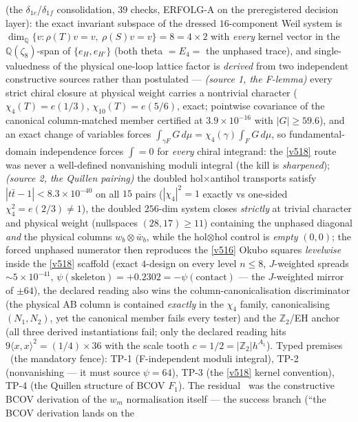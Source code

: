 \documentclass[11pt,a4paper]{article}
\newcommand{\Z}{\mathbb Z}
\begin{document}
\begin{itemize}
\begin{itemize}
 (the $\delta_{1e}$/$\delta_{1f}$
consolidation, $39$ checks, ERFOLG-A on the preregistered decision layer): the exact invariant
subspace of the dressed $16$-component Weil system is
$\dim_{\mathbb Q}\{v:\rho(T)v=v,\ \rho(S)v=v\}=8=4\times2$ with \emph{every} kernel vector in
the $\mathbb Q(\zeta_8)$-span of $\{e_H,e_{H'}\}$ (both theta $=E_4=$ the unphased trace), and
single-valuedness of the physical one-loop lattice factor is \emph{derived} from two
independent constructive sources rather than postulated --- \emph{(source 1, the F-lemma)}
every strict chiral closure at physical weight carries a nontrivial character
($\chi_4(T)=e(1/3)$, $\chi_{10}(T)=e(5/6)$, exact; pointwise covariance of the canonical
column-matched member certified at $3.9\times10^{-16}$ with $|G|\ge59.6$), and an exact change
of variables forces $\int_{\gamma F}G\,d\mu=\chi_4(\gamma)\int_FG\,d\mu$, so
fundamental-domain independence forces $\int=0$ for \emph{every} chiral integrand: the
\vref{v518} route was never a well-defined nonvanishing moduli integral (the kill is
\emph{sharpened}); \emph{(source 2, the Quillen pairing)} the doubled hol$\times$antihol
transports satisfy $|t\bar t-1|<8.3\times10^{-40}$ on all $15$ pairs ($|\chi_4|^2=1$ exactly vs
one-sided $\chi_4^2=e(2/3)\neq1$), the doubled $256$-dim system closes \emph{strictly} at
trivial character and physical weight (nullspaces $(28,17)\ge11$) containing the unphased
diagonal \emph{and} the physical columns $w_b\otimes\bar w_b$, while the hol$\otimes$hol control
is \emph{empty} $(0,0)$; the forced unphased numerator then reproduces the \vref{v516} Okubo
squares \emph{levelwise} inside the \vref{v518} scaffold (exact $4$-design on every level
$n\le8$, $J$-weighted spreads $\sim5\times10^{-41}$, $\psi(\text{skeleton})=+0.2302=
-\psi(\text{contact})$ --- the $J$-weighted mirror of $\pm64$), the declared reading also wins
the column-canonicalisation discriminator (the physical AB column is contained \emph{exactly}
in the $\chi_4$ family, canonicalising $(N_1,N_2)$, yet the canonical member fails every
tester) and the $\Z_2$/EH anchor (all three derived instantiations fail; only the declared
reading hits $9\langle x,x\rangle^2=(1/4)\times36$ with the scale tooth $c=1/2=|\Z_2|h^{A_1}$).
Typed premises \mC\ (the mandatory fence): TP-1 (F-independent moduli integral), TP-2
(nonvanishing --- it must source $\psi=64$), TP-3 (the \vref{v518} kernel convention), TP-4
(the Quillen structure of BCOV $F_1$). The residual \mO\ was the constructive BCOV derivation
of the $w_m$ normalisation itself --- the success branch (``the BCOV derivation lands on the

\end{itemize}
\end{itemize}
\end{document}
